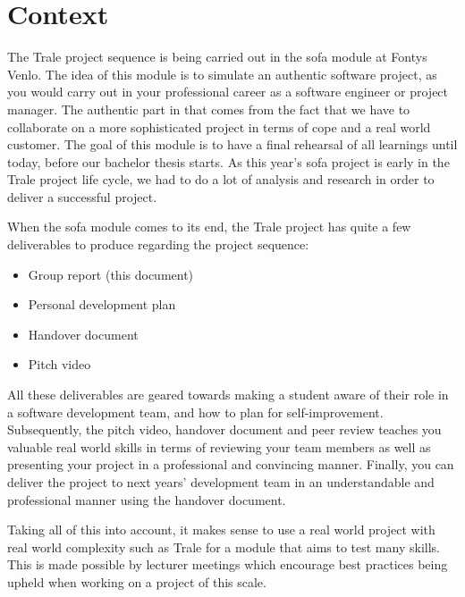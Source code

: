 \chapter{Context}\label{ch:context}
The Trale project sequence is being carried out in the \ac{sofa} module at Fontys Venlo.
The idea of this module is to simulate an authentic software project, as you would carry out in your professional career
as a software engineer or project manager.
The authentic part in that comes from the fact that we have to collaborate on a more sophisticated project in terms of
cope and a real world customer.
The goal of this module is to have a final rehearsal of all learnings until today, before our bachelor thesis starts.
As this year's \ac{sofa} project is early in the Trale project life cycle, we had to do a lot of analysis and research
in order to deliver a successful project.

When the \ac{sofa} module comes to its end, the Trale project has quite a few deliverables to produce regarding the
project sequence:

\begin{itemize}\setlength\itemsep{-.5em}
    \item Group report (this document)
    \item Personal development plan
    \item Handover document
    \item Pitch video
\end{itemize}

All these deliverables are geared towards making a student aware of their role in a software development team, and how
to plan for self-improvement.
Subsequently, the pitch video, handover document and peer review teaches you valuable real world skills in terms of
reviewing your team members as well as presenting your project in a professional and convincing manner.
Finally, you can deliver the project to next years' development team in an understandable and professional manner using
the handover document.

Taking all of this into account, it makes sense to use a real world project with real world complexity such as Trale
for a module that aims to test many skills.
This is made possible by lecturer meetings which encourage best practices being upheld when working on a project of
this scale.
